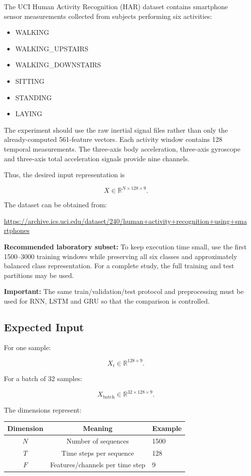 \documentclass[10pt]{article}
\begin{document}
The UCI Human Activity Recognition (HAR) dataset contains smartphone sensor
measurements collected from subjects performing six activities:

\begin{itemize}
\item WALKING
\item WALKING\_UPSTAIRS
\item WALKING\_DOWNSTAIRS
\item SITTING
\item STANDING
\item LAYING
\end{itemize}

The experiment should use the raw inertial signal files rather than only the
already-computed 561-feature vectors. Each activity window contains 128
temporal measurements. The three-axis body acceleration, three-axis
gyroscope and three-axis total acceleration signals provide nine channels.

Thus, the desired input representation is

\[
X\in\mathbb{R}^{N\times128\times9}.
\]

The dataset can be obtained from:

\url{https://archive.ics.uci.edu/dataset/240/human+activity+recognition+using+smartphones}

\textbf{Recommended laboratory subset:} To keep execution time small, use
the first 1500--3000 training windows while preserving all six classes and
approximately balanced class representation. For a complete study, the full
training and test partitions may be used.

\textbf{Important:} The same train/validation/test protocol and preprocessing
must be used for RNN, LSTM and GRU so that the comparison is controlled.

\subsection*{Expected Input}

For one sample:

\[
X_i\in\mathbb{R}^{128\times9}.
\]

For a batch of 32 samples:

\[
X_{\mathrm{batch}}\in\mathbb{R}^{32\times128\times9}.
\]

The dimensions represent:

\begin{center}
\begin{tabular}{|c|c|l|}
\hline
Dimension & Meaning & Example\\
\hline
$N$ & Number of sequences & 1500\\
$T$ & Time steps per sequence & 128\\
$F$ & Features/channels per time step & 9\\
\hline
\end{tabular}
\end{center}
\end{document}
